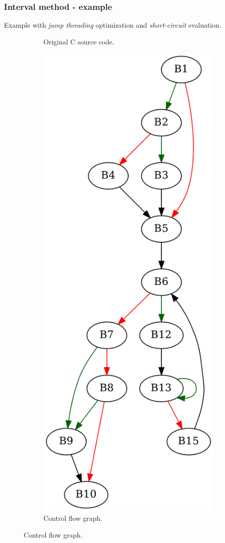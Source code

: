 \documentclass[aspectratio=1610]{beamer}
\begin{document}
\begin{frame}
	\frametitle{Interval method - example}
	Example with \textit{jump threading} optimization and \textit{short-circuit} evaluation.
	\begin{figure}[htbp]
		\centering
		\begin{subfigure}[b]{0.30\textwidth}
			\centering
			
			\caption{Original C source code.}
		\end{subfigure}
		\begin{subfigure}[b]{0.50\textwidth}
			\centering
			\includegraphics[height=0.6\paperheight]{inc/methods/interval/example/sample/f.png}
			\caption{Control flow graph.}
		\end{subfigure}
	\end{figure}
\end{frame}
\end{document}
